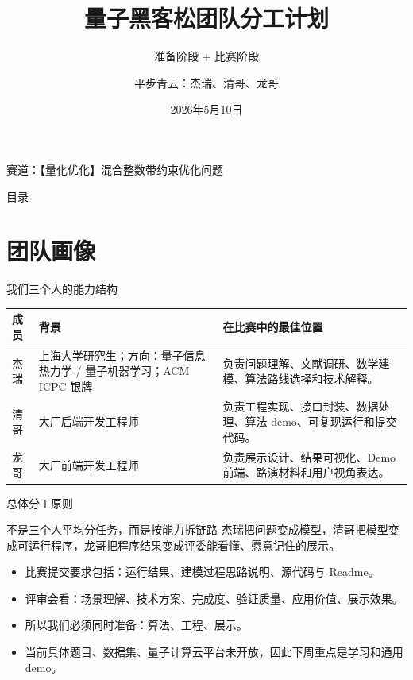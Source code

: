 \documentclass[aspectratio=169]{beamer}
\title[团队分工计划]{量子黑客松团队分工计划}
\subtitle{准备阶段 + 比赛阶段}
\author{平步青云：杰瑞、清哥、龙哥}
\date{2026年5月10日}
\begin{document}
\begin{frame}
  \titlepage
  \vspace{-0.5em}
  \begin{center}
    \footnotesize 赛道：【量化优化】混合整数带约束优化问题
  \end{center}
\end{frame}

\begin{frame}{目录}
  \tableofcontents
\end{frame}

\section{团队画像}

\begin{frame}{我们三个人的能力结构}
\small
\centering
\setlength{\tabcolsep}{4pt}
\begin{tabular}{p{1.8cm} p{4.4cm} p{5.4cm}}
\toprule
成员 & 背景 & 在比赛中的最佳位置 \\
\midrule
杰瑞 & 上海大学研究生；方向：量子信息热力学 / 量子机器学习；ACM ICPC 银牌 & 负责问题理解、文献调研、数学建模、算法路线选择和技术解释。 \\
清哥 & 大厂后端开发工程师 & 负责工程实现、接口封装、数据处理、算法 demo、可复现运行和提交代码。 \\
龙哥 & 大厂前端开发工程师 & 负责展示设计、结果可视化、Demo 前端、路演材料和用户视角表达。 \\
\bottomrule
\end{tabular}
\end{frame}

\begin{frame}{总体分工原则}
\small
\begin{block}{不是三个人平均分任务，而是按能力拆链路}
  杰瑞把问题变成模型，清哥把模型变成可运行程序，龙哥把程序结果变成评委能看懂、愿意记住的展示。
\end{block}

\begin{itemize}
  \item 比赛提交要求包括：运行结果、建模过程思路说明、源代码与 Readme。
  \item 评审会看：场景理解、技术方案、完成度、验证质量、应用价值、展示效果。
  \item 所以我们必须同时准备：算法、工程、展示。
  \item 当前具体题目、数据集、量子计算云平台未开放，因此下周重点是学习和通用 demo。
\end{itemize}
\end{frame}
\end{document}
